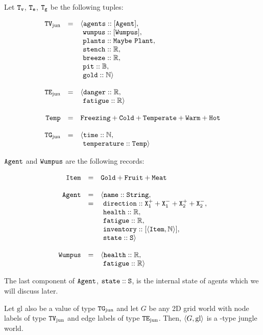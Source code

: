 \begin{definition}[\wjun]
\label{def:wjun}
Let $\mathtt{T_v}$, $\mathtt{T_e}$, $\mathtt{T_g}$ be the following tuples:

$$
	\begin{array}{r c l}
		\type{TV_{\mathrm{jun}}} & = & \langle \field{agents} :: [\type{Agent}],\\
		           &   &       \ \field{wumpus} :: [\type{Wumpus}],\\
		           &   & 	   \ \field{plants} :: \type{Maybe\ Plant},\\
		           &   &       \ \field{stench} :: \R,\\
		           &   &       \ \field{breeze} :: \R,\\
		           &   &	   \ \field{pit}    :: \B,\\
		           &   &	   \ \field{gold}   :: \N \rangle 
		\\
		\\
		\type{TE_{\mathrm{jun}}} & = & \langle \field{danger} :: \R,\\
				   &   &       \ \field{fatigue} :: \R \rangle
		\\
		\\
		\type{Temp} & = & \type{Freezing} + \type{Cold} + \type{Temperate} + \type{Warm} + \type{Hot}\\
		\\
		\type{TG_{\mathrm{jun}}} & = & \langle \field{time} :: \N,\\
				   &   &       \ \field{temperature} :: \type{Temp} \rangle
	\end{array}
$$

$\mathtt{Agent}$ and $\mathtt{Wumpus}$ are the following records:

$$
	\begin{array}{r c l}
		\mathtt{Item} & = & \mathtt{Gold + Fruit + Meat}\\
		\\
		\mathtt{Agent} & = & \langle \mathtt{name} :: \mathtt{String},\\ 
					 & = & \ \mathtt{direction} :: \mathtt{X_1^+ + X_1^- + X_2^+ + X_2^-},\\
					 &   & \ \mathtt{health} :: \mathbb{R},\\
					 &   & \ \mathtt{fatigue} :: \mathbb{R},\\
					 &   & \ \mathtt{inventory} :: [\mathtt{\langle Item, \mathbb{N} \rangle}],\\
					 &   & \ \mathtt{state} :: \mathtt{S} \rangle
		\\
		\\
		\mathtt{Wumpus} & = & \langle \mathtt{health} :: \mathbb{R},\\
					  &   & \ \mathtt{fatigue} :: \mathbb{R}\rangle
	\end{array}
$$

The last component of $\mathtt{Agent}$, $\mathtt{state} :: \mathtt{S}$, is the internal state of agents which we will discuss later.

Let $\mathrm{gl}$ also be a value of type $\mathtt{TG}_{\mathrm{jun}}$ and let $G$ be any 2D grid world with node labels of type $\mathtt{TV}_{\mathrm{jun}}$ and edge labels of type $\mathtt{TE}_{\mathrm{jun}}$. Then, $\langle G, \mathrm{gl} \rangle$ is a \wjun-type jungle world.
\end{definition}

